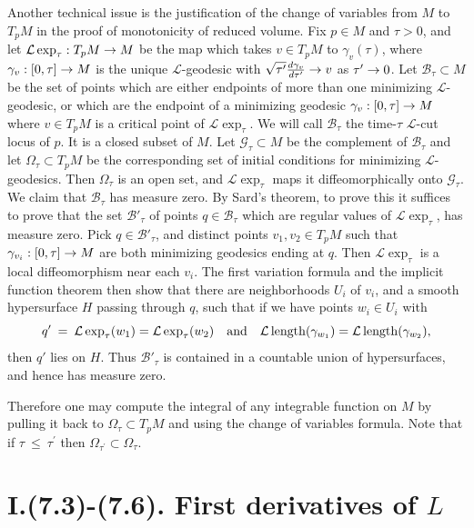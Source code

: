 Another technical issue is the justification of the change of variables
from $M$ to $T_pM$ in the proof of monotonicity of reduced volume.
Fix $p\in M$ and $\tau>0$, and let ${\mathcal L}\exp_\tau:T_pM\rightarrow M$
be the map which takes $v\in T_pM$ to $\gamma_v(\tau)$, where
$\gamma_v:[0,\tau]\rightarrow M$ is the unique ${\mathcal L}$-geodesic
with $\sqrt{\tau^\prime}\frac{d\gamma_v}{d\tau^\prime}\rightarrow v$ as
$\tau^\prime\rightarrow 0$.
Let ${\mathcal B}_\tau \subset M$ be the set of points which are
either endpoints of more than one minimizing ${\mathcal L}$-geodesic,
or which are the endpoint of a minimizing geodesic $\gamma_v:[0,\tau]\rightarrow M$
where $v\in T_pM$ is a critical point of ${\mathcal L}\exp_\tau$.
We will call ${\mathcal B}_\tau$
the time-$\tau$ ${\mathcal L}$-cut locus of $p$. It is a closed
subset of $M$.
Let ${\mathcal G}_\tau \subset M$ be the complement of ${\mathcal B}_\tau$ and
let $\Omega_\tau \subset T_pM$ be the corresponding set of initial
conditions for minimizing ${\mathcal L}$-geodesics.
Then $\Omega_\tau$ is an open set, and ${\mathcal L}\exp_\tau$
maps it diffeomorphically onto ${\mathcal G}_\tau$.  We claim that
${\mathcal B}_\tau$
has measure zero.   By Sard's theorem, to prove this it suffices
to prove that the set ${\mathcal B}'_\tau$ of points
$q\in {\mathcal B}_\tau$ which are
regular values of ${\mathcal L}\exp_\tau$, has measure zero.
Pick $q\in {\mathcal B}'_\tau$, and distinct points $v_1,v_2\in T_pM$
such that $\gamma_{v_i}:[0,\tau]\rightarrow M$ are both minimizing geodesics
ending at $q$.  Then ${\mathcal L}\exp_\tau$ is a local diffeomorphism
near each $v_i$. The first variation formula and the implicit function theorem
then show that there are neighborhoods
$U_i$ of $v_i$, and a smooth hypersurface $H$  passing through
$q$, such that if we have points $w_i\in U_i$ with
\begin{equation}
q' \: = \: {\mathcal L}\exp_\tau(w_1)={\mathcal L}\exp_\tau(w_2)\quad
\mbox{and}\quad{\mathcal L}\operatorname{length}(\gamma_{w_1})={\mathcal L}
\operatorname{length}(\gamma_{w_2}),
\end{equation}
then $q'$ lies on $H$.  Thus ${\mathcal B}'_\tau$
is contained in a countable union
of hypersurfaces, and hence has measure zero.

Therefore one may compute the integral of any integrable function on $M$
by pulling it back to $\Omega_\tau \subset T_pM$ and using the change
of variables formula.
Note that
if $\tau \: \le \: \tau^\prime$ then $\Omega_{\tau^\prime} \subset
\Omega_\tau$.


\section{I.(7.3)-(7.6). First derivatives of $L$}

